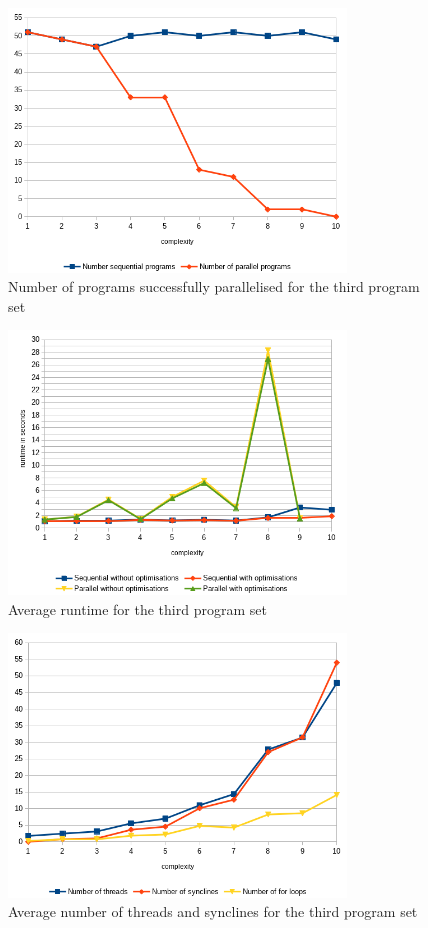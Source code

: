 \begin{figure}
    \centering
    \includegraphics[width=0.8\textwidth]{img/generated/par-success-3.png}
    \caption{\label{fig:gen-par-success-3}Number of programs successfully parallelised for the third program set}
\end{figure}
\begin{figure}
    \centering
    \includegraphics[width=0.8\textwidth]{img/generated/avg-runtime-3.png}
    \caption{\label{fig:gen-avg-runtime-3}Average runtime for the third program set}
\end{figure}
\begin{figure}
    \centering
    \includegraphics[width=0.8\textwidth]{img/generated/thread-count-3.png}
    \caption{\label{fig:gen-thread-count-3}Average number of threads and synclines for the third program set}
\end{figure}
